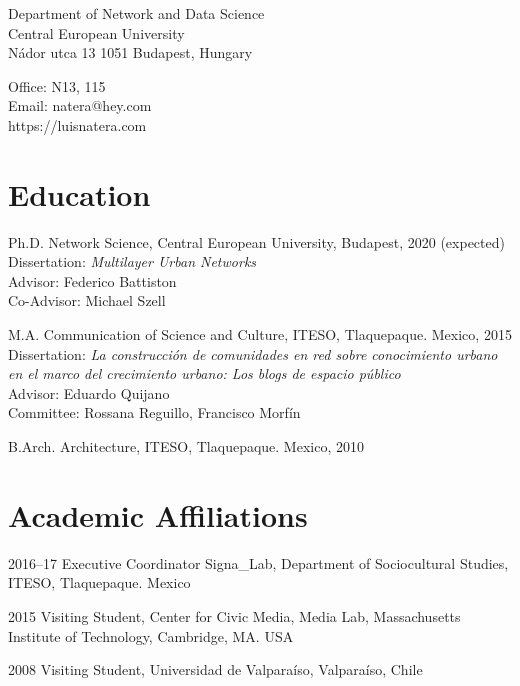 \documentclass{academiccv}
\begin{document}
\raggedright

\namefont{\myname}

\vspace{1em}
\begin{minipage}[t]{0.495\textwidth}
  Department of Network and Data Science \\
  Central European University \\
  Nádor utca 13
  1051 Budapest, Hungary
\end{minipage}
\begin{minipage}[t]{0.495\textwidth}
  Office: N13, 115 \\
  Email: natera@hey.com \\
  https://luisnatera.com \\\textbf{}
\end{minipage}
\vspace{0.5em}

\textbf{}

\section*{Education}
\begin{tablist}
	\item[Ph.D. ] \tab Network Science, Central European University, Budapest, 2020 (expected) \\
                  Dissertation: \textit{Multilayer Urban Networks} \\
                  Advisor: Federico Battiston \\
                  Co-Advisor: Michael Szell
	\item[M.A.]  \tab Communication of Science and Culture, ITESO, Tlaquepaque. Mexico, 2015 \\
					Dissertation: \textit{La construcción de comunidades en red sobre conocimiento urbano en el marco del crecimiento urbano: Los blogs de espacio público}\\
					Advisor: Eduardo Quijano \\
					Committee: Rossana Reguillo, Francisco Morfín
	\item[B.Arch.]  \tab Architecture,  ITESO, Tlaquepaque. Mexico, 2010
\end{tablist}


\section*{Academic Affiliations}
\begin{tablist}
	\item[2016--17] \tab Executive Coordinator Signa\_Lab, Department of Sociocultural Studies, ITESO, Tlaquepaque. Mexico
	\item[2015] \tab Visiting Student, Center for Civic Media,  Media Lab, Massachusetts Institute of Technology, Cambridge, MA. USA
	\item[2008] \tab Visiting Student, Universidad de Valparaíso, Valparaíso, Chile  
\end{tablist}
\end{document}
